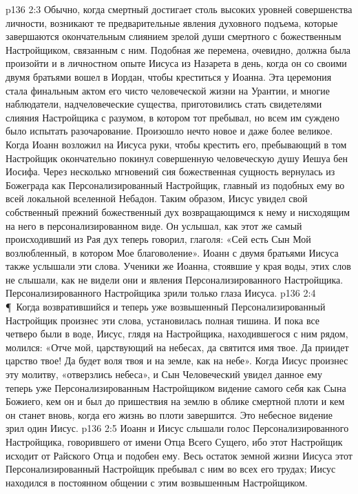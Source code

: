 \vs p136 2:3 Обычно, когда смертный достигает столь высоких уровней совершенства личности, возникают те предварительные явления духовного подъема, которые завершаются окончательным слиянием зрелой души смертного с божественным Настройщиком, связанным с ним. Подобная же перемена, очевидно, должна была произойти и в личностном опыте Иисуса из Назарета в день, когда он со своими двумя братьями вошел в Иордан, чтобы креститься у Иоанна. Эта церемония стала финальным актом его чисто человеческой жизни на Урантии, и многие наблюдатели, надчеловеческие существа, приготовились стать свидетелями слияния Настройщика с разумом, в котором тот пребывал, но всем им суждено было испытать разочарование. Произошло нечто новое и даже более великое. Когда Иоанн возложил на Иисуса руки, чтобы крестить его, пребывающий в том Настройщик окончательно покинул совершенную человеческую душу Иешуа бен Иосифа. Через несколько мгновений сия божественная сущность вернулась из Божеграда как Персонализированный Настройщик, главный из подобных ему во всей локальной вселенной Небадон. Таким образом, Иисус увидел свой собственный прежний божественный дух возвращающимся к нему и нисходящим на него в персонализированном виде. Он услышал, как этот же самый происходивший из Рая дух теперь говорил, глаголя: «Сей есть Сын Мой возлюбленный, в котором Мое благоволение». Иоанн с двумя братьями Иисуса также услышали эти слова. Ученики же Иоанна, стоявшие у края воды, этих слов не слышали, как не видели они и явления Персонализированного Настройщика. Персонализированного Настройщика зрили только глаза Иисуса.
\vs p136 2:4 \P\ Когда возвратившийся и теперь уже возвышенный Персонализированный Настройщик произнес эти слова, установилась полная тишина. И пока все четверо были в воде, Иисус, глядя на Настройщика, находившегося с ним рядом, молился: «Отче мой, царствующий на небесах, да святится имя твое. Да приидет царство твое! Да будет воля твоя и на земле, как на небе». Когда Иисус произнес эту молитву, «отверзлись небеса», и Сын Человеческий увидел данное ему теперь уже Персонализированным Настройщиком видение самого себя как Сына Божиего, кем он и был до пришествия на землю в облике смертной плоти и кем он станет вновь, когда его жизнь во плоти завершится. Это небесное видение зрил один Иисус.
\vs p136 2:5 Иоанн и Иисус слышали голос Персонализированного Настройщика, говорившего от имени Отца Всего Сущего, ибо этот Настройщик исходит от Райского Отца и подобен ему. Весь остаток земной жизни Иисуса этот Персонализированный Настройщик пребывал с ним во всех его трудах; Иисус находился в постоянном общении с этим возвышенным Настройщиком.
